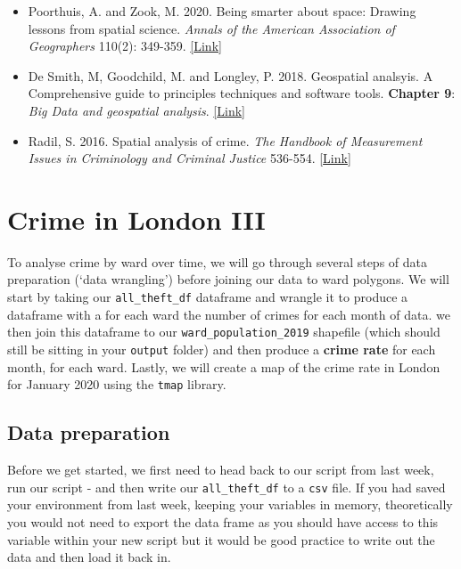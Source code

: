 \documentclass[
]{book}
\providecommand{\tightlist}{%
  \setlength{\itemsep}{0pt}\setlength{\parskip}{0pt}}
\begin{document}
\begin{itemize}
\tightlist
\item
  Poorthuis, A. and Zook, M. 2020. Being smarter about space: Drawing lessons from spatial science. \emph{Annals of the American Association of Geographers} 110(2): 349-359. \href{https://doi.org/10.1080/24694452.2019.1674630}{{[}Link{]}}
\item
  De Smith, M, Goodchild, M. and Longley, P. 2018. Geospatial analsyis. A Comprehensive guide to principles techniques and software tools. \textbf{Chapter 9}: \emph{Big Data and geospatial analysis}. \href{https://arxiv.org/pdf/1902.06672.pdf}{{[}Link{]}}
\item
  Radil, S. 2016. Spatial analysis of crime. \emph{The Handbook of Measurement Issues in Criminology and Criminal Justice} 536-554. \href{https://doi.org/10.1002/9781118868799.ch24}{{[}Link{]}}
\end{itemize}

\hypertarget{crime-in-london-iii}{%
\section{Crime in London III}\label{crime-in-london-iii}}

To analyse crime by ward over time, we will go through several steps of data preparation (`data wrangling') before joining our data to ward polygons. We will start by taking our \texttt{all\_theft\_df} dataframe and wrangle it to produce a dataframe with a for each ward the number of crimes for each month of data. we then join this dataframe to our \texttt{ward\_population\_2019} shapefile (which should still be sitting in your \texttt{output} folder) and then produce a \textbf{crime rate} for each month, for each ward. Lastly, we will create a map of the crime rate in London for January 2020 using the \texttt{tmap} library.

\hypertarget{data-preparation}{%
\subsection{Data preparation}\label{data-preparation}}

Before we get started, we first need to head back to our script from last week, run our script - and then write our \texttt{all\_theft\_df} to a \texttt{csv} file. If you had saved your environment from last week, keeping your variables in memory, theoretically you would not need to export the data frame as you should have access to this variable within your new script but it would be good practice to write out the data and then load it back in.
\end{document}
